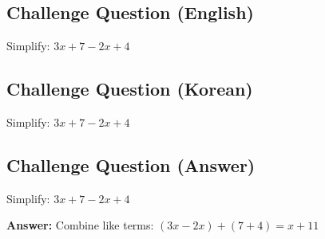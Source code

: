 \cleardoublepage
\subsection*{Challenge Question (English)}
Simplify: $3x + 7 - 2x + 4$


\newpage
\subsection*{Challenge Question (Korean)}
Simplify: $3x + 7 - 2x + 4$


\newpage
\subsection*{Challenge Question (Answer)}
Simplify: $3x + 7 - 2x + 4$

\textbf{Answer:} Combine like terms: $(3x - 2x) + (7 + 4) = x + 11$
